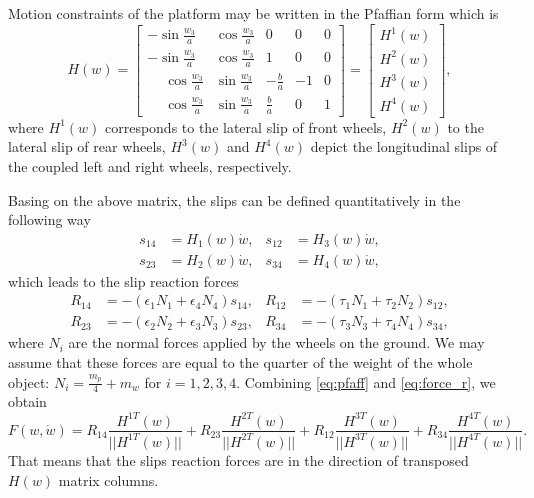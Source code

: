 Motion constraints of the platform may be written in the Pfaffian form which is 
\begin{equation}
\label{eq:pfaff}
H(w)=\begin{bmatrix}
-\sin\frac{w_3}{a} & \cos\frac{w_3}{a} & 0 & 0 & 0\\
-\sin\frac{w_3}{a} & \cos\frac{w_3}{a} & 1 & 0 & 0\\
\phantom{-}\cos\frac{w_3}{a} & \sin\frac{w_3}{a} & -\frac{b}{a} & -1 & 0\\
 \phantom{-}\cos\frac{w_3}{a} & \sin\frac{w_3}{a} &  \frac{b}{a} &  0 & 1
\end{bmatrix} = \begin{bmatrix}
H^1(w)\\
H^2(w)\\
H^3(w)\\
H^4(w)
\end{bmatrix},
\end{equation}
where $H^1(w)$ corresponds to the lateral slip of front wheels,
$H^2(w)$ to the lateral slip of rear wheels,
$H^3(w)$ and $H^4(w)$ depict the longitudinal slips of the coupled left and right wheels, respectively.

Basing on the above matrix, the slips can be defined quantitatively in the following way
\begin{equation}
\begin{aligned}
s_{14} &= H_1(w)\dot w, & s_{12} &= H_3(w)\dot w,\\
s_{23} &= H_2(w)\dot w, & s_{34} &= H_4(w)\dot w,
\end{aligned}
\end{equation}
which leads to the slip reaction forces
\begin{equation}
\begin{aligned}
\label{eq:force_r}
R_{14}&=-(\epsilon_1 N_1 + \epsilon_4 N_4)s_{14}, & R_{12}&=-(\tau_1 N_1 + \tau_2 N_2)s_{12},\\
R_{23}&=-(\epsilon_2 N_2 + \epsilon_3 N_3)s_{23}, & R_{34}&=-(\tau_3 N_3 + \tau_4 N_4)s_{34},
\end{aligned}
\end{equation}
where $N_i$ are the normal forces applied by the wheels on the ground. We may assume that these
forces are equal to the quarter of the weight of the whole object: $N_i=\frac{m_p}{4}+m_w$ for $i=1, 2, 3, 4$.
Combining \eqref{eq:pfaff} and \eqref{eq:force_r}, we obtain
\begin{equation}
F(w, \dot{w}) = R_{14}\frac{H^{1T}(w)}{||H^{1T}(w)||} + R_{23}\frac{H^{2T}(w)}{||H^{2T}(w)||} + R_{12}\frac{H^{3T}(w)}{||H^{3T}(w)||} + R_{34}\frac{H^{4T}(w)}{||H^{4T}(w)||}.
\end{equation}
That means that the slips reaction forces are in the direction of transposed $H(w)$ matrix columns.

